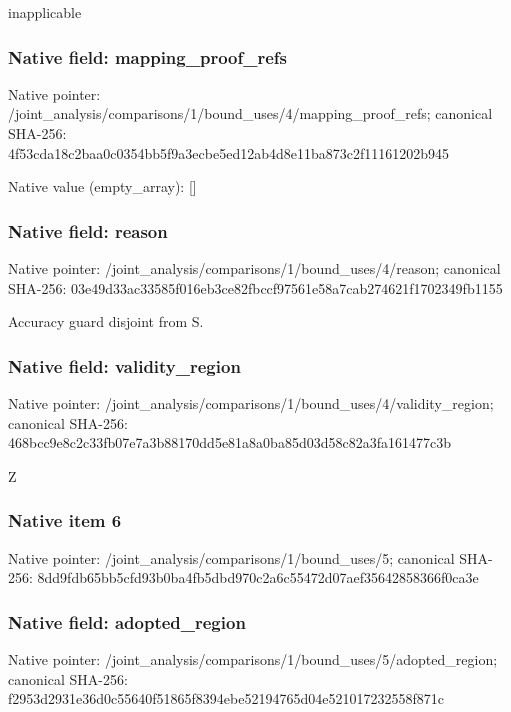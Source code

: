 \documentclass[10pt,a4paper]{article}
\begin{document}
\begingroup\raggedright\sloppy inapplicable\par\endgroup

\subsubsection{Native field: mapping\_\allowbreak{}proof\_\allowbreak{}refs}
Native pointer: /joint\_\allowbreak{}analysis/comparisons/1/bound\_\allowbreak{}uses/4/mapping\_\allowbreak{}proof\_\allowbreak{}refs; canonical SHA-256: 4f53cda18c2baa0c0354bb5f9a3ecbe5ed12ab4d8e11ba873c2f11161202b945

Native value (empty\_\allowbreak{}array): []

\subsubsection{Native field: reason}
Native pointer: /joint\_\allowbreak{}analysis/comparisons/1/bound\_\allowbreak{}uses/4/reason; canonical SHA-256: 03e49d33ac33585f016eb3ce82fbccf97561e58a7cab274621f1702349fb1155

\begingroup\raggedright\sloppy Accuracy guard disjoint from S.\par\endgroup

\subsubsection{Native field: validity\_\allowbreak{}region}
Native pointer: /joint\_\allowbreak{}analysis/comparisons/1/bound\_\allowbreak{}uses/4/validity\_\allowbreak{}region; canonical SHA-256: 468bcc9e8c2c33fb07e7a3b88170dd5e81a8a0ba85d03d58c82a3fa161477c3b

\begingroup\raggedright\sloppy Z\par\endgroup

\subsubsection{Native item 6}
Native pointer: /joint\_\allowbreak{}analysis/comparisons/1/bound\_\allowbreak{}uses/5; canonical SHA-256: 8dd9fdb65bb5cfd93b0ba4fb5dbd970c2a6c55472d07aef35642858366f0ca3e

\subsubsection{Native field: adopted\_\allowbreak{}region}
Native pointer: /joint\_\allowbreak{}analysis/comparisons/1/bound\_\allowbreak{}uses/5/adopted\_\allowbreak{}region; canonical SHA-256: f2953d2931e36d0c55640f51865f8394ebe52194765d04e521017232558f871c
\end{document}
